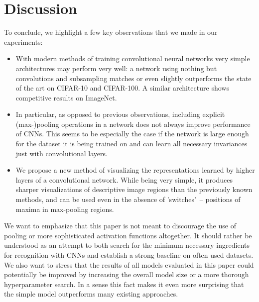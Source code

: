 \documentclass{article} %
\begin{document}
\section{Discussion}
To conclude, we highlight a few key observations that we made
in our experiments:
\begin{itemize}
 \item With modern methods of training convolutional neural networks very simple architectures may perform very well: a network using nothing but convolutions and subsampling matches or even slightly outperforms the state of the art on CIFAR-10 and CIFAR-100. A similar architecture shows competitive results on ImageNet.
 \item In particular, as opposed to previous observations, including explicit (max-)pooling operations in a network does not always improve performance of CNNs. This seems to be especially the case if the network is large enough for the dataset it is being trained on and can learn all necessary invariances just with convolutional layers.
 \item We propose a new method of visualizing the representations learned by higher layers of a convolutional network. While being very simple, it produces sharper visualizations of descriptive image regions than the previously known methods, and can be used even in the absence of 'switches'~-- positions of maxima in max-pooling regions.
\end{itemize}
We want to emphasize that this paper is not meant to discourage the use of pooling or more sophisticated activation functions altogether. It should rather be understood as an attempt to both search for the minimum necessary ingredients for  recognition with CNNs and establish a strong baseline on often used datasets. 
We also want to stress that the results of all models evaluated in this paper could potentially be improved by increasing the overall model size or a more thorough hyperparameter search. In a sense this fact makes it even more surprising that the simple model outperforms many existing approaches. %

\end{document}
